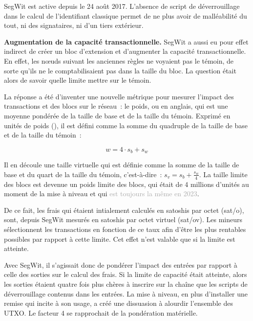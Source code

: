 SegWit est active depuis le 24 août 2017. L'absence de script de déverrouillage dans le calcul de l'identifiant classique permet de ne plus avoir de malléabilité du tout, ni des signataires, ni d'un tiers extérieur.

\textbf{Augmentation de la capacité transactionnelle.} SegWit a aussi eu pour effet indirect de créer un bloc d'extension et d'augmenter la capacité transactionnelle. En effet, les nœuds suivant les anciennes règles ne voyaient pas le témoin, de sorte qu'ils ne le comptabilisaient pas dans la taille du bloc. La question était alors de savoir quelle limite mettre sur le témoin.

La réponse a été d'inventer une nouvelle métrique pour mesurer l'impact des transactions et des blocs sur le réseau~: le poids, ou  en anglais, qui est une moyenne pondérée de la taille de base et de la taille du témoin. Exprimé en unités de poids (), il est défini comme la somme du quadruple de la taille de base et de la taille du témoin~:

\[
w = 4 \cdot s_b + s_w
\]

Il en découle une taille virtuelle qui est définie comme la somme de la taille de base et du quart de la taille du témoin, c'est-à-dire~: $s_v = s_b + \frac{s_w}{4}$. La taille limite des blocs est devenue un poids limite des blocs, qui était de 4 millions d'unités au moment de la mise à niveau et qui \textcolor{darkgray}{est toujours la même en 2023}.

De ce fait, les frais qui étaient intialement calculés en satoshis par octet (sat/o), sont, depuis SegWit mesurés en satoshis par octet virtuel (sat/ov). Les mineurs sélectionnent les transactions en fonction de ce taux afin d'être les plus rentables possibles par rapport à cette limite. Cet effet n'est valable que si la limite est atteinte.

Avec SegWit, il s'agissait donc de pondérer l'impact des entrées par rapport à celle des sorties sur le calcul des frais. Si la limite de capacité était atteinte, alors les sorties étaient quatre fois plus chères à inscrire sur la chaîne que les scripts de déverrouillage contenus dans les entrées. La mise à niveau, en plus d'installer une remise qui incite à son usage, a créé une dissuasion à alourdir l'ensemble des UTXO. Le facteur 4 se rapprochait de la pondération matérielle.

